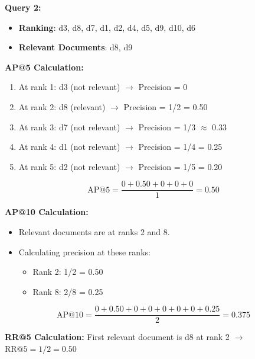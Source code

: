 \documentclass[a4paper, utf8]{ctexart}
\begin{document}
	\vspace{.5em}
	
	\textbf{Query 2:}
	
	\begin{itemize}[itemsep=2pt, topsep=0pt, parsep=0pt]
	    \item \textbf{Ranking}: d3, d8, d7, d1, d2, d4, d5, d9, d10, d6
	    \item \textbf{Relevant Documents}: d8, d9
	\end{itemize}
	
	\textbf{AP@5 Calculation:}
	
	\begin{enumerate}[itemsep=2pt, topsep=0pt, parsep=0pt]
	    \item At rank 1: d3 (not relevant) $\rightarrow$ Precision = 0
	    \item At rank 2: d8 (relevant) $\rightarrow$ Precision = 1/2 = 0.50
	    \item At rank 3: d7 (not relevant) $\rightarrow$ Precision = 1/3 $\approx$ 0.33
	    \item At rank 4: d1 (not relevant) $\rightarrow$ Precision = 1/4 = 0.25
	    \item At rank 5: d2 (not relevant) $\rightarrow$ Precision = 1/5 = 0.20
	\end{enumerate}
	
	\begin{equation}
		\text{AP@5} = \frac{0 + 0.50 + 0 + 0 + 0}{1} = 0.50
		\nonumber
	\end{equation}
	
	\textbf{AP@10 Calculation:}
	
	\begin{itemize}[itemsep=2pt, topsep=0pt, parsep=0pt]
		\item Relevant documents are at ranks 2 and 8.
		\item Calculating precision at these ranks:
		\begin{itemize}[itemsep=2pt, topsep=0pt, parsep=0pt]
		    \item Rank 2: 1/2 = 0.50
		    \item Rank 8: 2/8 = 0.25
		\end{itemize}
	\end{itemize}
	
	\begin{equation}
		\text{AP@10} = \frac{0 + 0.50 + 0 + 0 + 0 + 0 + 0 + 0.25}{2} = 0.375
		\nonumber
	\end{equation}

	\textbf{RR@5 Calculation:} \quad First relevant document is d8 at rank 2 $\rightarrow$ $\text{RR@5} = 1/2 = 0.50$
	
\end{document}
